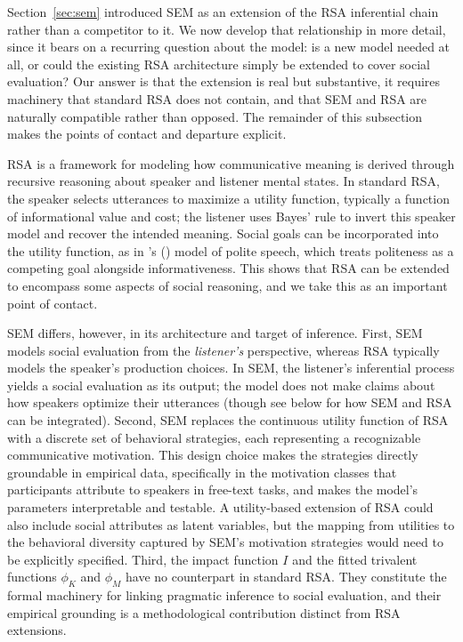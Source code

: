 \documentclass[12pt,a4paper]{article}
\begin{document}
Section~\ref{sec:sem} introduced SEM as an extension of the RSA inferential
chain rather than a competitor to it. We now develop that relationship in more
detail, since it bears on a recurring question about the model: is a new model
needed at all, or could the existing RSA architecture simply be extended to
cover social evaluation? Our answer is that the extension is real but
substantive, it requires machinery that standard RSA does not contain, and that
SEM and RSA are naturally compatible rather than opposed. The remainder of this
subsection makes the points of contact and departure explicit.

RSA is a framework for modeling how communicative meaning is derived through
recursive reasoning about speaker and listener mental states. In standard RSA,
the speaker selects utterances to maximize a utility function, typically a
function of informational value and cost; the listener uses Bayes' rule to invert
this speaker model and recover the intended meaning. Social goals can be
incorporated into the utility function, as in \citeauthor{yoontessleretal2020}'s
(\citeyear{yoontessleretal2020}) model of polite speech, which treats politeness
as a competing goal alongside informativeness. This shows that RSA can be
extended to encompass some aspects of social reasoning, and we take this as an
important point of contact.

SEM differs, however, in its architecture and target of inference. First, SEM
models social evaluation from the \emph{listener's} perspective, whereas RSA
typically models the speaker's production choices. In SEM, the listener's
inferential process yields a social evaluation as its output; the model does not
make claims about how speakers optimize their utterances (though see below for
how SEM and RSA can be integrated). Second, SEM replaces the continuous utility
function of RSA with a discrete set of behavioral strategies, each representing a
recognizable communicative motivation. This design choice makes the strategies
directly groundable in empirical data, specifically in the motivation classes
that participants attribute to speakers in free-text tasks, and makes the model's
parameters interpretable and testable. A utility-based extension of RSA could
also include social attributes as latent variables, but the mapping from
utilities to the behavioral diversity captured by SEM's motivation strategies
would need to be explicitly specified. Third, the impact function $I$ and the
fitted trivalent functions $\phi_K$ and $\phi_M$ have no counterpart in standard
RSA. They constitute the formal machinery for linking pragmatic inference to
social evaluation, and their empirical grounding is a methodological contribution
distinct from RSA extensions.
\end{document}
